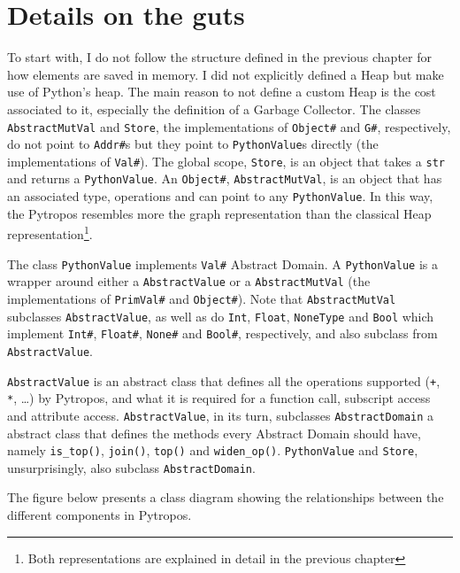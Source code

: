 \section{Details on the guts}\label{details-on-the-guts}

To start with, I do not follow the structure defined in the previous
chapter for how elements are saved in memory. I did not explicitly
defined a Heap but make use of Python's heap. The main reason to not
define a custom Heap is the cost associated to it, especially the
definition of a Garbage Collector. The classes \texttt{AbstractMutVal}
and \texttt{Store}, the implementations of \texttt{Object\#} and
\texttt{G\#}, respectively, do not point to \texttt{Addr\#}s but they
point to \texttt{PythonValue}s directly (the implementations of
\texttt{Val\#}). The global scope, \texttt{Store}, is an object that
takes a \texttt{str} and returns a \texttt{PythonValue}. An
\texttt{Object\#}, \texttt{AbstractMutVal}, is an object that has an
associated type, operations and can point to any \texttt{PythonValue}.
In this way, the Pytropos resembles more the graph representation than
the classical Heap representation\footnote{Both representations are
  explained in detail in the previous chapter}.

The class \texttt{PythonValue} implements \texttt{Val\#} Abstract
Domain. A \texttt{PythonValue} is a wrapper around either a
\texttt{AbstractValue} or a \texttt{AbstractMutVal} (the implementations
of \texttt{PrimVal\#} and \texttt{Object\#}). Note that
\texttt{AbstractMutVal} subclasses \texttt{AbstractValue}, as well as do
\texttt{Int}, \texttt{Float}, \texttt{NoneType} and \texttt{Bool} which
implement \texttt{Int\#}, \texttt{Float\#}, \texttt{None\#} and
\texttt{Bool\#}, respectively, and also subclass from
\texttt{AbstractValue}.

\texttt{AbstractValue} is an abstract class that defines all the
operations supported (\texttt{+}, \texttt{*}, \ldots{}) by Pytropos, and
what it is required for a function call, subscript access and attribute
access. \texttt{AbstractValue}, in its turn, subclasses
\texttt{AbstractDomain} a abstract class that defines the methods every
Abstract Domain should have, namely \texttt{is\_top()}, \texttt{join()},
\texttt{top()} and \texttt{widen\_op()}. \texttt{PythonValue} and
\texttt{Store}, unsurprisingly, also subclass \texttt{AbstractDomain}.

The figure below presents a class diagram showing the relationships
between the different components in Pytropos.

